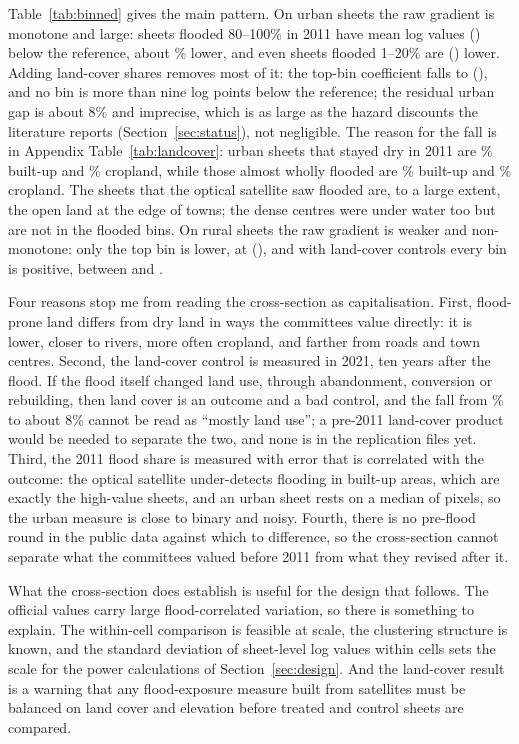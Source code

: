 Table~\ref{tab:binned} gives the main pattern. On urban sheets the raw gradient is monotone and large: sheets flooded 80--100\% in 2011 have mean log values \binTopUrbanNoLc{} (\binTopUrbanNoLcSe) below the reference, about \binTopUrbanPct\% lower, and even sheets flooded 1--20\% are \binLowUrbanNoLc{} (\binLowUrbanNoLcSe) lower. Adding land-cover shares removes most of it: the top-bin coefficient falls to \binTopUrbanLc{} (\binTopUrbanLcSe), and no bin is more than nine log points below the reference; the residual urban gap is about 8\% and imprecise, which is as large as the hazard discounts the literature reports (Section~\ref{sec:status}), not negligible. The reason for the fall is in Appendix Table~\ref{tab:landcover}: urban sheets that stayed dry in 2011 are \lcUrbanBuiltRef\% built-up and \lcUrbanCropRef\% cropland, while those almost wholly flooded are \lcUrbanBuiltTop\% built-up and \lcUrbanCropTop\% cropland. The sheets that the optical satellite saw flooded are, to a large extent, the open land at the edge of towns; the dense centres were under water too but are not in the flooded bins. On rural sheets the raw gradient is weaker and non-monotone: only the top bin is lower, at \binTopRuralNoLc{} (\binTopRuralNoLcSe), and with land-cover controls every bin is positive, between \binLowRuralLc{} and \binTopRuralLc.

Four reasons stop me from reading the cross-section as capitalisation. First, flood-prone land differs from dry land in ways the committees value directly: it is lower, closer to rivers, more often cropland, and farther from roads and town centres. Second, the land-cover control is measured in 2021, ten years after the flood. If the flood itself changed land use, through abandonment, conversion or rebuilding, then land cover is an outcome and a bad control, and the fall from \binTopUrbanPct\% to about 8\% cannot be read as ``mostly land use''; a pre-2011 land-cover product would be needed to separate the two, and none is in the replication files yet. Third, the 2011 flood share is measured with error that is correlated with the outcome: the optical satellite under-detects flooding in built-up areas, which are exactly the high-value sheets, and an urban sheet rests on a median of \supPxOneK{} pixels, so the urban measure is close to binary and noisy. Fourth, there is no pre-flood round in the public data against which to difference, so the cross-section cannot separate what the committees valued before 2011 from what they revised after it.

What the cross-section does establish is useful for the design that follows. The official values carry large flood-correlated variation, so there is something to explain. The within-cell comparison is feasible at scale, the clustering structure is known, and the standard deviation of sheet-level log values within cells sets the scale for the power calculations of Section~\ref{sec:design}. And the land-cover result is a warning that any flood-exposure measure built from satellites must be balanced on land cover and elevation before treated and control sheets are compared.
